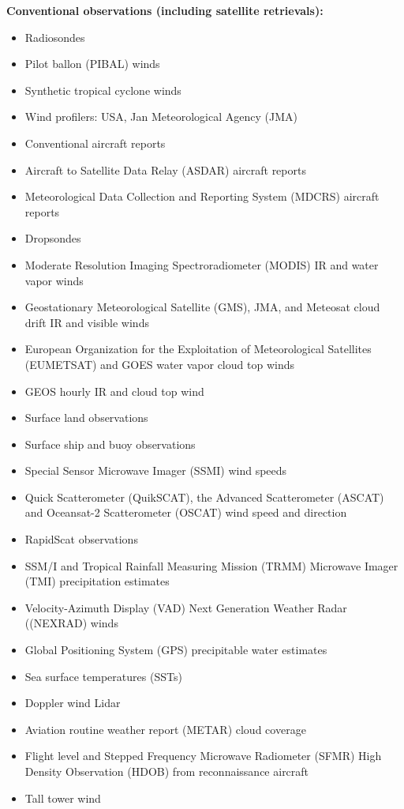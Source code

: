 \textbf{Conventional observations (including satellite retrievals):}
\begin{itemize}
\item Radiosondes
\item Pilot ballon (PIBAL) winds
\item Synthetic tropical cyclone winds
\item Wind profilers: USA, Jan Meteorological Agency (JMA)
\item Conventional aircraft reports
\item Aircraft to Satellite Data Relay (ASDAR) aircraft reports
\item Meteorological Data Collection and Reporting System (MDCRS) aircraft reports
\item Dropsondes
\item Moderate Resolution Imaging Spectroradiometer (MODIS) IR and water vapor winds
\item Geostationary Meteorological Satellite (GMS), JMA, and Meteosat cloud drift IR and visible winds 
\item European Organization for the Exploitation of Meteorological Satellites (EUMETSAT) and GOES water vapor cloud top winds
\item GEOS hourly IR and cloud top wind
\item Surface land observations
\item Surface ship and buoy observations
\item Special Sensor Microwave Imager (SSMI) wind speeds
\item Quick Scatterometer (QuikSCAT), the Advanced Scatterometer (ASCAT) and Oceansat-2 Scatterometer (OSCAT) wind speed and direction
\item RapidScat observations
\item SSM/I and Tropical Rainfall Measuring Mission (TRMM) Microwave Imager (TMI) precipitation estimates
\item Velocity-Azimuth Display (VAD) Next Generation Weather Radar ((NEXRAD) winds
\item Global Positioning System (GPS) precipitable water estimates
\item Sea surface temperatures (SSTs)
\item Doppler wind Lidar
\item Aviation routine weather report (METAR) cloud coverage
\item Flight level and Stepped Frequency Microwave Radiometer (SFMR) High Density
Observation (HDOB) from reconnaissance aircraft
\item Tall tower wind
\end{itemize}


